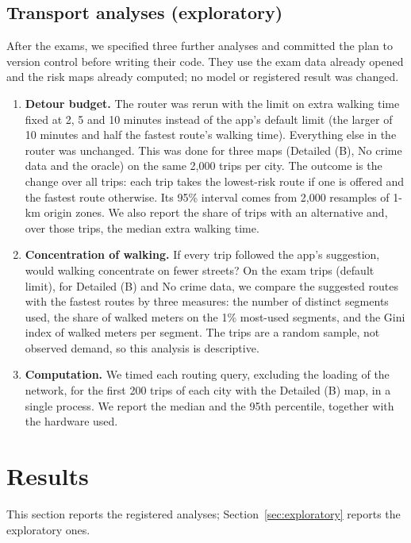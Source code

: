 \documentclass[preprint,12pt,authoryear]{elsarticle}
\begin{document}
\subsection{Transport analyses (exploratory)}\label{sec:transport-methods}
After the exams, we specified three further analyses and committed the plan to version control before writing their code. They use the exam data already opened and the risk maps already computed; no model or registered result was changed.
\begin{enumerate}
  \item \textbf{Detour budget.} The router was rerun with the limit on extra walking time fixed at 2, 5 and 10 minutes instead of the app's default limit (the larger of 10 minutes and half the fastest route's walking time). Everything else in the router was unchanged. This was done for three maps (Detailed (B), No crime data and the oracle) on the same 2,000 trips per city. The outcome is the change over all trips: each trip takes the lowest-risk route if one is offered and the fastest route otherwise. Its 95\% interval comes from 2,000 resamples of 1-km origin zones. We also report the share of trips with an alternative and, over those trips, the median extra walking time.
  \item \textbf{Concentration of walking.} If every trip followed the app's suggestion, would walking concentrate on fewer streets? On the exam trips (default limit), for Detailed (B) and No crime data, we compare the suggested routes with the fastest routes by three measures: the number of distinct segments used, the share of walked meters on the 1\% most-used segments, and the Gini index of walked meters per segment. The trips are a random sample, not observed demand, so this analysis is descriptive.
  \item \textbf{Computation.} We timed each routing query, excluding the loading of the network, for the first 200 trips of each city with the Detailed (B) map, in a single process. We report the median and the 95th percentile, together with the hardware used.
\end{enumerate}

\section{Results}\label{sec:results}
This section reports the registered analyses; Section~\ref{sec:exploratory} reports the exploratory ones.
\end{document}
